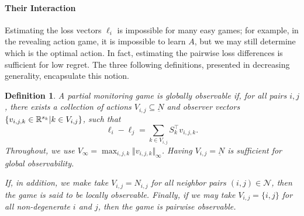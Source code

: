 \documentclass{article}
\newtheorem{definition}{Definition}
\begin{document}
\paragraph{Their Interaction}
Estimating the loss vectors $\ell_i$ is impossible for many easy games; for example, in the revealing action game, it is impossible to learn $A$, but we may still determine which is the optimal action. In fact, estimating the pairwise loss differences is sufficient for low regret. The three following definitions, presented in decreasing generality, encapsulate this notion.
\begin{definition}
  A partial monitoring game is \emph{globally observable} if, for all pairs $i,j$, there exists a collection of actions $V_{i,j}\subseteq \underbar N$ and observer vectors
  $\{ v_{i,j,k}\in\mathbb R^{s_k} |k\in V_{i,j}\}$, such that 
  \begin{equation}
  \ell_i - \ell_j = \sum_{k\in V_{i,j}} S_k^\top v_{i,j,k}.
\end{equation}
Throughout, we use $V_\infty = \max_{i,j,k} \Vert v_{i,j,k}\Vert_\infty$. Having $V_{i,j} = \underbar N$ is sufficient for global observability.

If, in addition, we make take $V_{i,j} = N_{i,j}$ for all neighbor pairs $(i,j)\in\mathcal N$, then the game is said to be \emph{locally observable}. Finally, if we may take $V_{i,j} = \{i,j\}$ for all non-degenerate $i$ and $j$, then the game is \emph{pairwise observable}.
\end{definition}
\end{document}

